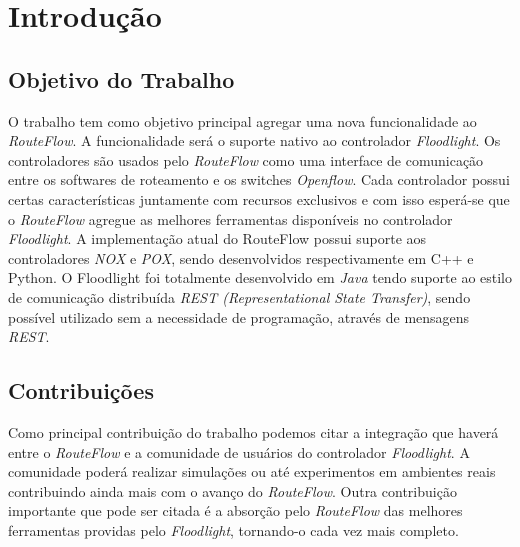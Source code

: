 \chapter{Introdução}

\section{Objetivo do Trabalho}
O trabalho tem como objetivo principal agregar uma nova funcionalidade ao \textit{RouteFlow}. A 
funcionalidade será o suporte nativo ao controlador \textit{Floodlight}. Os controladores são usados 
pelo 
\textit{RouteFlow} como uma interface de comunicação entre os softwares de roteamento e os switches 
\textit{Openflow}. Cada controlador possui certas características juntamente com recursos exclusivos e 
com isso esperá-se que o \textit{RouteFlow} agregue as melhores ferramentas disponíveis no controlador 
\textit{Floodlight}.
 A implementação atual do RouteFlow possui suporte aos controladores \textit{NOX} e \textit{POX}, sendo 
desenvolvidos respectivamente em C++ e Python. O Floodlight foi totalmente desenvolvido em \textit{Java} 
tendo suporte ao estilo de comunicação distribuída \textit{REST (Representational State Transfer)}, 
sendo possível utilizado sem a necessidade de programação,  através de mensagens \textit{REST}.

\section{Contribuições}
Como principal contribuição do trabalho podemos citar a integração que haverá entre o \textit{RouteFlow} 
e a comunidade de usuários do controlador \textit{Floodlight}. A comunidade poderá realizar simulações 
ou até experimentos em ambientes reais contribuindo ainda mais com o avanço do \textit{RouteFlow}. Outra 
contribuição importante que pode ser citada é a absorção pelo  \textit{RouteFlow} das melhores 
ferramentas providas pelo \textit{Floodlight}, tornando-o cada vez mais completo.
